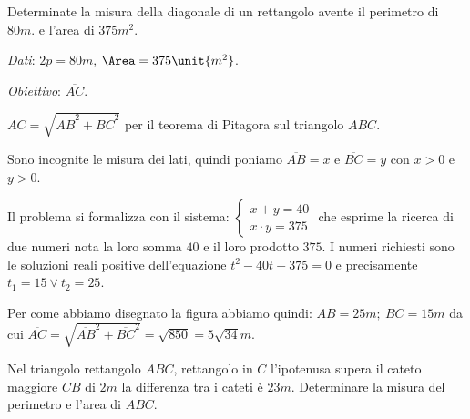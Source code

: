 \begin{problema}
Determinate la misura della diagonale di un rettangolo avente il perimetro di 
\(80\unit{m}\). e l'area di \(375\unit{m^2}\).
\end{problema}

{
\emph{Dati}: \(2 p = 80 \unit{m}\), \(\Area = 375\unit{m^2}\).

\emph{Obiettivo}: \(\overline {AC}\).
}
{\begin{center}
 
\end{center}}

\begin{soluzione}

\(\overline {AC} = \sqrt{\overline {AB}^{2} +\overline {BC}^{2}}\) per il 
teorema 
di Pitagora sul triangolo \(ABC\).

Sono incognite le misura dei lati, quindi poniamo \(\overline {AB} = x\) e 
\(\overline {BC} = y \) con \(x > 0\) e \(y > 0\).

Il problema si formalizza con il sistema:
\(\left\{ \begin{array}{l} x +y = 40 \\x \cdot y = 375 \end{array}\right.\)
che esprime la ricerca di due numeri nota la loro somma \(40\) e il loro 
prodotto 
\(375\). I numeri richiesti sono le soluzioni reali positive dell'equazione 
\(t^{2} 
-40 t +375 = 0\) e precisamente \(t_{1} = 15 \vee t_{2} = 25\).

Per come abbiamo disegnato la figura abbiamo quindi: \(AB = 25\unit{m};~BC = 
15\unit{m}\) da cui \(\overline {AC} = \sqrt{\overline {AB}^{2} +\overline 
{BC}^{2}} =\sqrt{850} = 5 \sqrt{34}\unit{m}\).
\end{soluzione}

\begin{problema}
Nel triangolo rettangolo \(ABC\), rettangolo in \(C\) l'ipotenusa supera il 
cateto maggiore \(CB\) di \(2\unit{m}\) la differenza tra i cateti è 
\(23\unit{m}\). 
Determinare la misura del perimetro e l'area di \(ABC\).
\end{problema}


